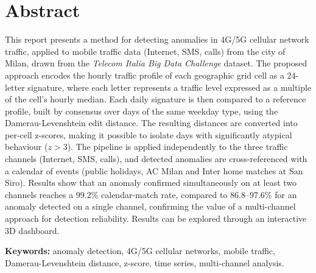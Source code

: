 \chapter*{Abstract}


This report presents a method for detecting anomalies in 4G/5G
cellular network traffic, applied to mobile traffic data (Internet,
SMS, calls) from the city of Milan, drawn from the \emph{Telecom
Italia Big Data Challenge} dataset. The proposed approach encodes the
hourly traffic profile of each geographic grid cell as a 24-letter
signature, where each letter represents a traffic level expressed as a
multiple of the cell's hourly median. Each daily signature is then
compared to a reference profile, built by consensus over days of the
same weekday type, using the Damerau-Levenshtein edit distance. The
resulting distances are converted into per-cell z-scores, making it
possible to isolate days with significantly atypical behaviour
($z > 3$). The pipeline is applied independently to the three traffic
channels (Internet, SMS, calls), and detected anomalies are
cross-referenced with a calendar of events (public holidays, AC Milan
and Inter home matches at San Siro). Results show that an anomaly
confirmed simultaneously on at least two channels reaches a 99.2\%
calendar-match rate, compared to 86.8--97.6\% for an anomaly detected on a
single channel, confirming the value of a multi-channel approach for
detection reliability. Results can be explored through an interactive
3D dashboard.

\vspace{4mm}
\noindent\textbf{Keywords:} anomaly detection, 4G/5G cellular networks,
mobile traffic, Damerau-Levenshtein distance, z-score, time series,
multi-channel analysis.

